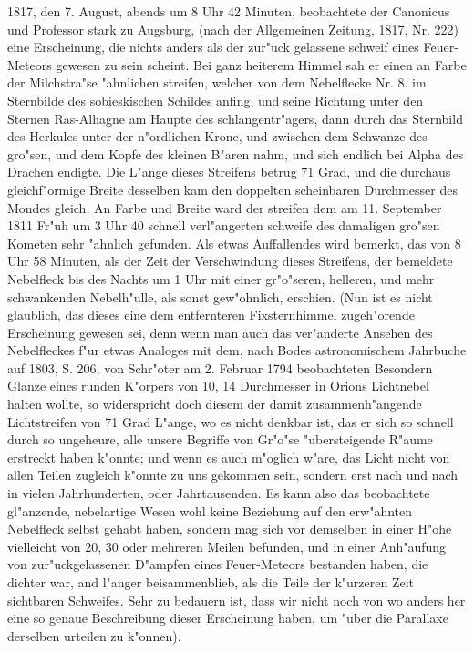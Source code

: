 \documentclass[a4paper, 11pt, oneside, polutonikogreek, german]{article}
\begin{document}
1817, den 7. August, abends um 8 Uhr 42 Minuten, beobachtete der Canonicus und Professor stark zu Augsburg, (nach der Allgemeinen Zeitung, 1817, Nr. 222) eine Erscheinung, die nichts anders als der zur"uck gelassene schweif eines Feuer-Meteors gewesen zu sein scheint. Bei ganz heiterem Himmel sah er einen an Farbe der Milchstra"se "ahnlichen streifen, welcher von dem Nebelflecke Nr. 8. im Sternbilde des sobieskischen Schildes anfing, und seine Richtung unter den Sternen Ras-Alhagne am Haupte des schlangentr"agers, dann durch das Sternbild des Herkules unter der n"ordlichen Krone, und zwischen dem Schwanze des gro"sen, und dem Kopfe des kleinen B"aren nahm, und sich endlich bei Alpha des Drachen endigte. Die L"ange dieses Streifens betrug 71 Grad, und die durchaus gleichf"ormige Breite desselben kam den doppelten scheinbaren Durchmesser des Mondes gleich. An Farbe und Breite ward der streifen dem am 11. September 1811 Fr"uh um 3 Uhr 40 schnell verl"angerten schweife des damaligen gro"sen Kometen sehr "ahnlich gefunden. Als etwas Auffallendes wird bemerkt, das von 8 Uhr 58 Minuten, als der Zeit der Verschwindung dieses Streifens, der bemeldete Nebelfleck bis des Nachts um 1 Uhr mit einer gr"o"seren, helleren, und mehr schwankenden Nebelh"ulle, als sonst gew"ohnlich, erschien. (Nun ist es nicht glaublich, das dieses eine dem entfernteren Fixsternhimmel zugeh"orende Erscheinung gewesen sei, denn wenn man auch das ver"anderte Ansehen des Nebelfleckes f"ur etwas Analoges mit dem, nach Bodes astronomischem Jahrbuche auf 1803, S. 206, von Schr"oter am 2. Februar 1794 beobachteten Besondern Glanze eines runden K"orpers von 10, 14 Durchmesser in Orions Lichtnebel halten wollte, so widerspricht doch diesem der damit zusammenh"angende Lichtstreifen von 71 Grad L"ange, wo es nicht denkbar ist, das er sich so schnell durch so ungeheure, alle unsere Begriffe von Gr"o"se "ubersteigende R"aume erstreckt haben k"onnte; und wenn es auch m"oglich w"are, das Licht nicht von allen Teilen zugleich k"onnte zu uns gekommen sein, sondern erst nach und nach in vielen Jahrhunderten, oder Jahrtausenden. Es kann also das beobachtete gl"anzende, nebelartige Wesen wohl keine Beziehung auf den erw"ahnten Nebelfleck selbst gehabt haben, sondern mag sich vor demselben in einer H"ohe vielleicht von 20, 30 oder mehreren Meilen befunden, und in einer Anh"aufung von zur"uckgelassenen D"ampfen eines Feuer-Meteors bestanden haben, die dichter war, and l"anger beisammenblieb, als die Teile der k"urzeren Zeit sichtbaren Schweifes. Sehr zu bedauern ist, dass wir nicht noch von wo anders her eine so genaue Beschreibung dieser Erscheinung haben, um "uber die Parallaxe derselben urteilen zu k"onnen).
\end{document}
